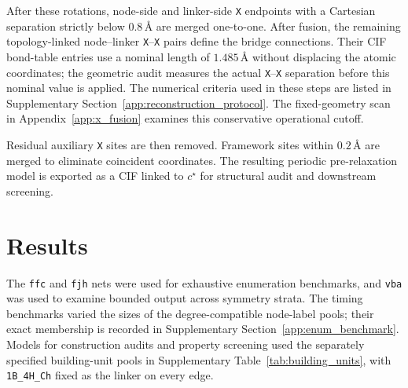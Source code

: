 \documentclass[a5paper, 10pt]{article}
\begin{document}
After these rotations, node-side and linker-side \texttt{X} endpoints with a Cartesian separation strictly below $0.8\,\text{\AA}$ are merged one-to-one. After fusion, the remaining topology-linked node--linker \texttt{X}--\texttt{X} pairs define the bridge connections. Their CIF bond-table entries use a nominal length of $1.485\,\text{\AA}$ without displacing the atomic coordinates; the geometric audit measures the actual \texttt{X}--\texttt{X} separation before this nominal value is applied. The numerical criteria used in these steps are listed in Supplementary Section~\ref{app:reconstruction_protocol}. The fixed-geometry scan in Appendix~\ref{app:x_fusion} examines this conservative operational cutoff.

Residual auxiliary \texttt{X} sites are then removed. Framework sites within $0.2\,\text{\AA}$ are merged to eliminate coincident coordinates. The resulting periodic pre-relaxation model is exported as a CIF linked to $c^\star$ for structural audit and downstream screening.

\section{Results}

The \texttt{ffc} and \texttt{fjh} nets were used for exhaustive enumeration benchmarks, and \texttt{vba} was used to examine bounded output across symmetry strata. The timing benchmarks varied the sizes of the degree-compatible node-label pools; their exact membership is recorded in Supplementary Section~\ref{app:enum_benchmark}. Models for construction audits and property screening used the separately specified building-unit pools in Supplementary Table~\ref{tab:building_units}, with \texttt{1B\_4H\_Ch} fixed as the linker on every edge.
\end{document}

